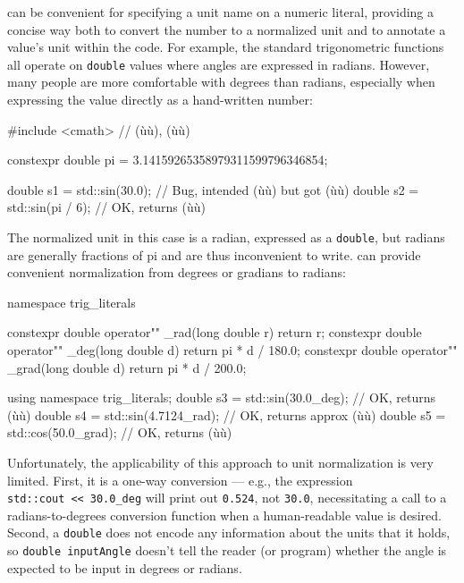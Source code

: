  can be convenient for specifying a unit name on a numeric
literal, providing a concise way both to convert the number to a
normalized unit and to annotate a value's unit within the code. For
example, the standard trigonometric functions all operate on
\lstinline!double! values where angles are expressed in radians. However,
many people are more comfortable with degrees than radians, especially
when expressing the value directly as a hand-written number:

\begin{emcppslisting}[emcppsbatch=e19]
#include <cmath>  // (ù{}ù), (ù{}ù)

constexpr double pi = 3.14159265358979311599796346854;

double s1 = std::sin(30.0);    // Bug, intended (ù{}ù) but got (ù{}ù)
double s2 = std::sin(pi / 6);  // OK, returns (ù{}ù)
\end{emcppslisting}
    
\noindent The normalized unit in this case is a radian, expressed as a
\lstinline!double!, but radians are generally fractions of pi and are thus
inconvenient to write.  can provide convenient
normalization from degrees or gradians to radians:

\begin{emcppslisting}[emcppsbatch=e19]
namespace trig_literals {

constexpr double operator"" _rad(long double r)  { return r; }
constexpr double operator"" _deg(long double d)  { return pi * d / 180.0; }
constexpr double operator"" _grad(long double d) { return pi * d / 200.0; }

}

using namespace trig_literals;
double s3 = std::sin(30.0_deg);     // OK, returns (ù{}ù)
double s4 = std::sin(4.7124_rad);   // OK, returns approx (ù{}ù)
double s5 = std::cos(50.0_grad);    // OK, returns (ù{}ù)
\end{emcppslisting}
    
\noindent Unfortunately, the applicability of this approach to unit normalization
is very limited. First, it is a one-way conversion --- e.g., the
expression \lstinline!std::cout!~\lstinline!<<!~\lstinline!30.0_deg! will print
out \lstinline!0.524!, not \lstinline!30.0!, necessitating a call to a
radians-to-degrees conversion function when a human-readable value is
desired. Second, a \lstinline!double! does not encode any information about
the units that it holds, so \lstinline!double!~\lstinline!inputAngle! doesn't
tell the reader (or program) whether the angle is expected to be input
in degrees or radians.

